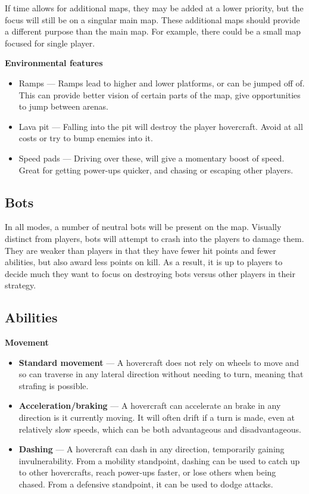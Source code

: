 \documentclass{article}
\theoremstyle{definition}
\begin{document}
If time allows for additional maps, they may be added at a lower priority, but
the focus will still be on a singular main map. These additional maps should
provide a different purpose than the main map. For example, there could be
a small map focused for single player.

\textbf{Environmental features}

\begin{itemize}
  \item Ramps --- Ramps lead to higher and lower platforms, or can be jumped
    off of. This can provide better vision of certain parts of the map, give
    opportunities to jump between arenas.
  \item Lava pit --- Falling into the pit will destroy the player hovercraft.
    Avoid at all costs or try to bump enemies into it.
  \item Speed pads --- Driving over these, will give a momentary boost of
    speed. Great for getting power-ups quicker, and chasing or escaping other
    players.
\end{itemize}

\subsection{Bots}

In all modes, a number of neutral bots will be present on the map. Visually
distinct from players, bots will attempt to crash into the players to damage
them. They are weaker than players in that they have fewer hit points and fewer
abilities, but also award less points on kill. As a result, it is up to players
to decide much they want to focus on destroying bots versus other players in
their strategy.

\subsection{Abilities}

\textbf{Movement}

\begin{itemize}
  \item \textbf{Standard movement} --- A hovercraft does not rely on wheels to
    move and so can traverse in any lateral direction without needing to turn,
    meaning that strafing is possible.
  \item \textbf{Acceleration/braking} --- A hovercraft can accelerate an brake
    in any direction is it currently moving. It will often drift if a turn is
    made, even at relatively slow speeds, which can be both advantageous and
    disadvantageous.
  \item \textbf{Dashing} --- A hovercraft can dash in any direction,
    temporarily gaining invulnerability. From a mobility standpoint, dashing
    can be used to catch up to other hovercrafts, reach power-ups faster, or
    lose others when being chased. From a defensive standpoint, it can be used
    to dodge attacks.
\end{itemize}
\end{document}
